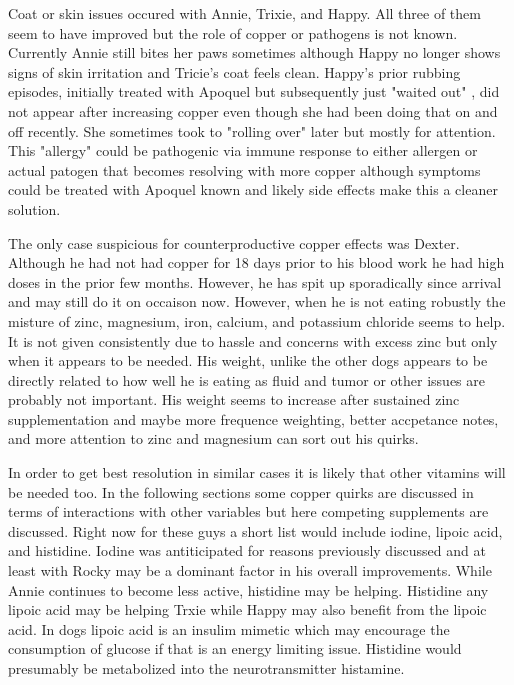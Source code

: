 Coat or skin issues occured with Annie, Trixie, and Happy.
All three of them seem to have improved but the role of
copper or pathogens is not known. Currently Annie still bites her paws sometimes
although Happy no longer shows signs of skin irritation and Tricie's
coat feels clean. 
Happy's prior rubbing episodes, initially treated with Apoquel but 
subsequently just "waited out" , did not appear
after increasing copper even though she had been doing that on and
off recently.
She sometimes took to "rolling over" later but mostly for attention. 
 This "allergy" could be  pathogenic via 
immune response to either allergen or actual patogen 
that becomes resolving with more copper although symptoms
could be treated with Apoquel known and likely side effects
make this a cleaner solution. 

The only case suspicious for counterproductive copper effects  was Dexter. 
Although he had not
had copper for 18 days prior to his blood work he had high
doses in the prior few months. However, he has spit up sporadically
since arrival and may still do it on occaison now. However,
when he is not eating robustly the misture of zinc, magnesium,
iron, calcium, and potassium chloride seems to help. It is not
given consistently due to hassle and concerns with excess zinc
but only when it appears to be needed.
His weight, unlike the other dogs appears to be directly related
to how well he is eating as fluid and tumor or other issues
are probably not important. His weight seems to increase after
sustained zinc supplementation and maybe more frequence weighting,
better accpetance notes, and more attention to zinc and magnesium
can sort out his quirks.

In order to get best resolution in similar cases it is likely
that other vitamins will be needed too. In the following sections
some copper quirks are discussed in terms of interactions with
other variables but here competing supplements are discussed.
Right now for these guys a short list would include iodine,
lipoic acid, and histidine. Iodine was antiticipated for
reasons previously discussed and at least with Rocky may 
be a dominant factor in his overall improvements. While
Annie continues to become less active, histidine may be
helping. Histidine any lipoic acid may be helping Trxie
while Happy may also benefit from the lipoic acid. In dogs lipoic
acid is  an insulim mimetic which may encourage the consumption
of glucose if that is an energy limiting issue. 
Histidine would presumably be metabolized into the neurotransmitter
histamine. 


